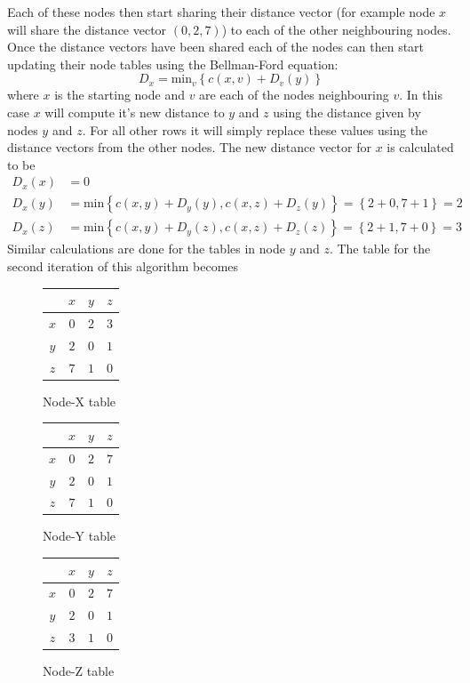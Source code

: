 \documentclass{article}
\begin{document}
Each of these nodes then start sharing their distance vector (for example node $x$ will share the distance vector $\left( 0,2,7 \right)$) to each of the other neighbouring nodes. Once the distance vectors have been shared each of the nodes can then start updating their node tables using the Bellman-Ford equation:
\[
    D_{x} = \text{min}_{v} \left\{ c(x,v) + D_{v}(y) \right\}
\]
where $x$ is the starting node and $v$ are each of the nodes neighbouring $v$. In this case $x$ will compute it's new distance to $y$ and $z$ using the distance given by nodes $y$ and $z$. For all other rows it will simply replace these values using the distance vectors from the other nodes. The new distance vector for $x$ is calculated to be
\begin{align*}
    D_{x} (x) &= 0 \\
    D_{x} (y) &= \text{min} \left\{ c(x,y) + D_{y}(y), c(x,z) + D_{z}(y) \right\} = \left\{ 2 + 0, 7 + 1 \right\} = 2 \\
    D_{x} (z) &= \text{min} \left\{ c(x,y) + D_{y}(z), c(x,z) + D_{z}(z) \right\} = \left\{ 2 + 1, 7 + 0 \right\} = 3
\end{align*}
Similar calculations are done for the tables in node $y$ and $z$. The table for the second iteration of this algorithm becomes
\begin{figure}[!htb]
   \begin{minipage}{0.3\textwidth}
    \centering
     \begin{tabular}{ c | ccc } 
        \, & $x$ & $y$ & $z$ \\
        \hline
        $x$ & 0 & 2 & 3 \\
        $y$ & $2$ & $0$ & $1$ \\
        $z$ & $7$ & $1$ & $0$ \\
    \end{tabular}
    \caption*{Node-X table}
   \end{minipage}
   \begin{minipage}{0.3\textwidth}
    \centering
     \begin{tabular}{ c | ccc } 
        \, & $x$ & $y$ & $z$ \\
        \hline
        $x$ & $0$ & $2$ & $7$ \\
        $y$ & $2$ & $0$ & $1$ \\
        $z$ & $7$ & $1$ & $0$ \\
    \end{tabular}
    \caption*{Node-Y table}
   \end{minipage}
   \begin{minipage}{0.3\textwidth}
    \centering
     \begin{tabular}{ c | ccc } 
        \, & $x$ & $y$ & $z$ \\
        \hline
        $x$ & $0$ & $2$ & $7$ \\
        $y$ & $2$ & $0$ & $1$ \\
        $z$ & $3$ & $1$ & $0$ \\
    \end{tabular}
    \caption*{Node-Z table}
   \end{minipage}
\end{figure}
\end{document}

